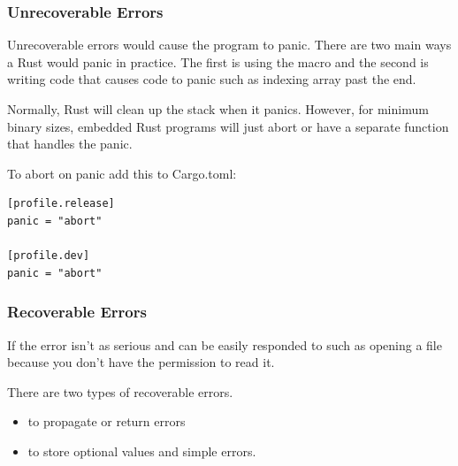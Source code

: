 \documentclass{beamer}
\begin{document}
\begin{frame}
  \frametitle{Unrecoverable Errors}
  Unrecoverable errors would cause the program to panic. There are two main ways a Rust would panic in practice. The first is using the  macro and the second is writing code that causes code to panic such as indexing array past the end.
  
  Normally, Rust will clean up the stack when it panics. However, for minimum binary sizes, embedded Rust programs will just abort or have a separate function that handles the panic.

  \pagebreak

  To abort on panic add this to Cargo.toml:

\begin{lstlisting}
[profile.release]
panic = "abort"

[profile.dev]
panic = "abort"
\end{lstlisting}
\end{frame}

\begin{frame}
  \frametitle{Recoverable Errors}
  If the error isn't as serious and can be easily responded to such as opening a file because you don't have the permission to read it.

  There are two types of recoverable errors.
  \begin{itemize}
    \item{ to propagate or return errors}
    \item{ to store optional values and simple errors.}
  \end{itemize}
\end{frame}
\end{document}
